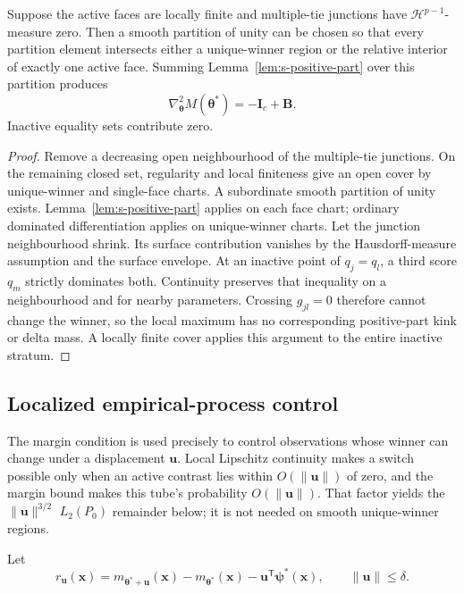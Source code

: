 \begin{lemma}
\label{lem:s-strata}
Suppose the active faces are locally finite and multiple-tie junctions have
$\mathcal H^{p-1}$-measure zero.  Then a smooth partition of unity can be
chosen so that every partition element intersects either a unique-winner
region or the relative interior of exactly one active face.  Summing
Lemma~\ref{lem:s-positive-part} over this partition produces
\[
 \nabla_{\boldsymbol{\theta}}^2M(\boldsymbol{\theta}^*)
 =-\mathbf{I}_c+\mathbf{B}.
\]
Inactive equality sets contribute zero.
\end{lemma}

\begin{proof}
Remove a decreasing open neighbourhood of the multiple-tie junctions.  On the
remaining closed set, regularity and local finiteness give an open cover by
unique-winner and single-face charts.  A subordinate smooth partition of
unity exists.  Lemma~\ref{lem:s-positive-part} applies on each face chart;
ordinary dominated differentiation applies on unique-winner charts.  Let the
junction neighbourhood shrink.  Its surface contribution vanishes by the
Hausdorff-measure assumption and the surface envelope. At an inactive point of
$q_j=q_l$, a third score $q_m$ strictly dominates both. Continuity preserves
that inequality on a neighbourhood and for nearby parameters. Crossing
$g_{jl}=0$ therefore cannot change the winner, so the local maximum has no
corresponding positive-part kink or delta mass. A locally finite cover applies
this argument to the entire inactive stratum.
\end{proof}

\subsection{Localized empirical-process control}

The margin condition is used precisely to control observations whose winner
can change under a displacement $\mathbf u$. Local Lipschitz continuity makes
a switch possible only when an active contrast lies within
$O(\|\mathbf u\|)$ of zero, and the margin bound makes this tube's probability
$O(\|\mathbf u\|)$. That factor yields the $\|\mathbf u\|^{3/2}$
$L_2(P_0)$ remainder below; it is not needed on smooth unique-winner regions.

Let
\[
 r_{\mathbf{u}}(\mathbf{x})
 =m_{\boldsymbol{\theta}^*+\mathbf{u}}(\mathbf{x})
  -m_{\boldsymbol{\theta}^*}(\mathbf{x})
  -\mathbf{u}^\mathsf T\boldsymbol{\psi}^*(\mathbf{x}),
 \qquad \|\mathbf{u}\|\leq\delta.
\]

